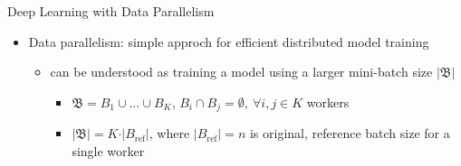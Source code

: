 \begin{frame}{Deep Learning with Data Parallelism}
\protect\hypertarget{deep-learning-with-data-parallelism-3}{}

\begin{itemize}
\tightlist
\item
  Data parallelism: simple approch for efficient distributed model
  training

  \begin{itemize}
  \tightlist
  \item
    can be understood as training a model using a larger mini-batch size
    \(\vert \mathfrak{B} \vert\)

    \begin{itemize}
    \tightlist
    \item
      \(\mathfrak{B} = B_1 \cup \ldots \cup B_K\),
      \(B_i \cap B_j = \emptyset,\ \forall i,j \in K\) workers
      \vspace*{2mm}
    \item
      \(\vert \mathfrak{B} \vert = K \cdot \vert B_{\text{ref}} \vert\),
      where \(\vert B_{\text{ref}} \vert = n\) is original, reference
      batch size for a single worker
    \end{itemize}
  \end{itemize}
\end{itemize}


\end{frame}

